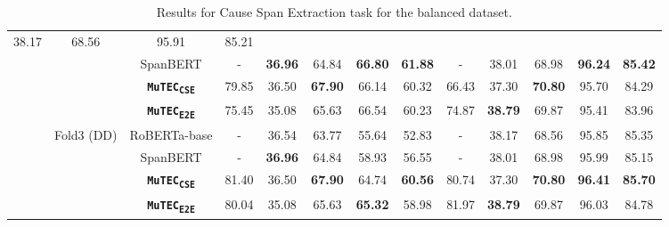 \documentclass{article}
\newcommand{\subone}{\textbf{\texttt{MuTEC\textsubscript{CSE}}}}
\newcommand{\overall}{\textbf{\texttt{MuTEC\textsubscript{E2E}}}}
\begin{document}
\begin{table*}[h]
{\begin{tabular}{|c|c|c|ccccc|ccccc|}
  \multicolumn{1}{c|}{38.17} &
  \multicolumn{1}{c|}{68.56} &
  \multicolumn{1}{c|}{95.91} &
  85.21
   \\ \cline{3-13} 
 &
   &
  SpanBERT &
  \multicolumn{1}{c|}{-} &
  \multicolumn{1}{c|}{\textbf{36.96}} &
  \multicolumn{1}{c|}{64.84} &
  \multicolumn{1}{c|}{\textbf{66.80}} &
   \textbf{61.88} &
  \multicolumn{1}{c|}{-} &
  \multicolumn{1}{c|}{38.01} &
  \multicolumn{1}{c|}{68.98} &
  \multicolumn{1}{c|}{\textbf{96.24}} &
  \textbf{85.42}
   \\ \cline{3-13} 
 &
   &
  \subone &
  \multicolumn{1}{c|}{79.85} &
  \multicolumn{1}{c|}{36.50} &
  \multicolumn{1}{c|}{\textbf{67.90}} &
  \multicolumn{1}{c|}{66.14} &
  60.32 &
  \multicolumn{1}{c|}{66.43} &
  \multicolumn{1}{c|}{37.30} &
  \multicolumn{1}{c|}{\textbf{70.80}} &
  \multicolumn{1}{c|}{95.70} &
  84.29 
  \\ \cline{3-13} 
 &
   &
  \overall &
  \multicolumn{1}{c|}{75.45} &
  \multicolumn{1}{c|}{35.08} &
  \multicolumn{1}{c|}{65.63} &
  \multicolumn{1}{c|}{66.54} &
  60.23 &
  \multicolumn{1}{c|}{74.87} &
  \multicolumn{1}{c|}{\textbf{38.79}} &
  \multicolumn{1}{c|}{69.87} &
  \multicolumn{1}{c|}{95.41} &
  83.96
   \\ \cline{2-13} 
 &
  \multirow{3}{*}{Fold3 (DD)} &
  RoBERTa-base &
  \multicolumn{1}{c|}{-} &
  \multicolumn{1}{c|}{36.54} &
  \multicolumn{1}{c|}{63.77} &
  \multicolumn{1}{c|}{55.64} &
   52.83 &
  \multicolumn{1}{c|}{-} &
  \multicolumn{1}{c|}{38.17} &
  \multicolumn{1}{c|}{68.56} &
  \multicolumn{1}{c|}{95.85} &
  85.35
   \\ \cline{3-13} 
 &
   &
  SpanBERT &
  \multicolumn{1}{c|}{-} &
  \multicolumn{1}{c|}{\textbf{36.96}} &
  \multicolumn{1}{c|}{64.84} &
  \multicolumn{1}{c|}{58.93} &
   56.55 &
  \multicolumn{1}{c|}{-} &
  \multicolumn{1}{c|}{38.01} &
  \multicolumn{1}{c|}{68.98} &
  \multicolumn{1}{c|}{95.99} &
  85.15
   \\ \cline{3-13} 
 &
   &
  \subone &
  \multicolumn{1}{c|}{81.40} &
  \multicolumn{1}{c|}{36.50} &
  \multicolumn{1}{c|}{\textbf{67.90}} &
  \multicolumn{1}{c|}{64.74} &
   \textbf{60.56} &
  \multicolumn{1}{c|}{80.74} &
  \multicolumn{1}{c|}{37.30} &
  \multicolumn{1}{c|}{\textbf{70.80}} &
  \multicolumn{1}{c|}{\textbf{96.41}} &
  \textbf{85.70}
  \\ \cline{3-13} 
 &
   &
  \overall &
  \multicolumn{1}{c|}{80.04} &
  \multicolumn{1}{c|}{35.08} &
  \multicolumn{1}{c|}{65.63} &
  \multicolumn{1}{c|}{\textbf{65.32}} &
  58.98 &
  \multicolumn{1}{c|}{81.97} &
  \multicolumn{1}{c|}{\textbf{38.79}} &
  \multicolumn{1}{c|}{69.87} &
  \multicolumn{1}{c|}{96.03} &
  84.78
   \\ \hline

\end{tabular}
}
\caption{Results for Cause Span Extraction task for the balanced dataset.} 
\label{tab:sub1_balanced}
\end{table*}
\end{document}
